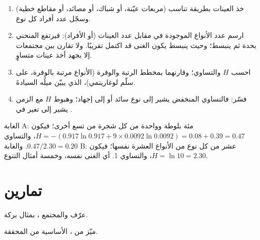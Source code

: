 \begin{method}\label{met:b1:ecosystem-organization:sampling}
\begin{enumerate}
  \item خذ العينات بطريقة تناسب  (مربعات عيّنة، أو شباك،
        أو مصائد، أو مقاطع خطية) وسجّل عدد أفراد كل
        نوع.
  \item ارسم عدد الأنواع الموجودة في مقابل عدد العينات
        (أو الأفراد): فيرتفع المنحني بحدة ثم
        ينبسط؛ وحيث ينبسط يكون الغنى قد اكتمل تقريبًا.
        ولا تقارن بين مجتمعات إلا بجهد أخذ عينات متساوٍ.
  \item احسب $H$ والتساوي؛ وقارنهما بمخطط الرتبة والوفرة
        (الأنواع مرتبة بالوفرة، على سلّم لوغاريتمي)، الذي يبيّن
        ميلُه السيادةَ.
  \item فسّر: فالتساوي المنخفض يشير إلى نوع سائد أو إلى
        إجهاد؛ وهبوط $H$ مع الزمن يشير إلى تغير في
        .
\end{enumerate}
\end{method}

\begin{example}[غابتان]\label{ex:b1:ecosystem-organization:twowoods}
الغابة A: مئة بلوطة وواحدة من كل شجرة من تسع أخرى؛ فيكون $H = -(0.917\ln
0.917 + 9\times 0.0092\ln 0.0092) = 0.08 + 0.39 = 0.47$، والتساوي
$0.47/2.30 = 0.20$. والغابة B: عشر من كل نوع من الأنواع العشرة نفسها؛ فيكون $H =
\ln 10 = 2.30$، والتساوي 1. أي الغنى نفسه، وخمسة أمثال التنوع.
\end{example}

\section{تمارين}

\begin{exercise}[$\star$]\label{exo:b1:ecosystem-organization:1}
عرّف  والمجتمع ، بمثال بركة.
\end{exercise}

\begin{exercise}[$\star$]\label{exo:b1:ecosystem-organization:2}
ميّز  من ،  الأساسية من المحققة.
\end{exercise}

